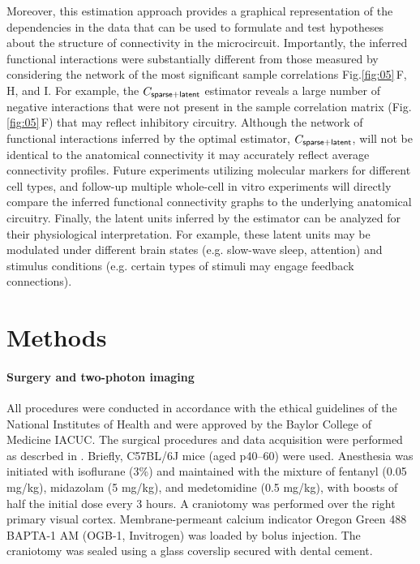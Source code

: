 \documentclass[10pt]{article}
\newcommand{\figref}[2]{Fig.\;\ref{fig:#1}\,#2}
\begin{document}
Moreover, this estimation approach provides a graphical representation of the dependencies in the data that can be used to formulate and test hypotheses about the structure of connectivity in the microcircuit. Importantly, the inferred functional interactions were substantially different from those measured by considering the network of the most significant sample correlations \figref{05}{F, H, and I}.  For example, the $C_{\sf sparse+latent}$ estimator reveals a large number of negative interactions that were not present in the sample correlation matrix (\figref{05}{F}) that may reflect inhibitory circuitry.  Although the network of functional interactions inferred by the optimal estimator, $C_{\sf sparse+latent}$, will not be identical to the anatomical connectivity it may accurately reflect average connectivity profiles. Future experiments utilizing molecular markers for different cell types, and follow-up multiple whole-cell in vitro experiments \cite{Hofer:2011, Ko:2013} will directly compare the inferred functional connectivity graphs to the underlying anatomical circuitry. Finally, the latent units inferred by the estimator can be analyzed for their physiological interpretation. For example, these latent units may be modulated under different brain states (e.g. slow-wave sleep, attention) and stimulus conditions (e.g. certain types of stimuli may engage feedback connections). 

\section*{Methods}
\paragraph{Surgery and two-photon imaging}
All procedures were conducted in accordance with the ethical guidelines of the National Institutes of Health and were approved by the Baylor College of Medicine IACUC.  The surgical procedures and data acquisition were performed as descrbed in \cite{Cotton:2013}. Briefly, C57BL/6J mice (aged p40--60) were used. Anesthesia was initiated with isoflurane (3\%) and maintained with the mixture of fentanyl (0.05 mg/kg), midazolam (5 mg/kg), and medetomidine (0.5 mg/kg), with boosts of half the initial dose every 3 hours.  A craniotomy was performed over the right primary visual cortex.  Membrane-permeant calcium indicator Oregon Green 488 BAPTA-1 AM (OGB-1, Invitrogen) was loaded by bolus injection.  The craniotomy was sealed using a glass coverslip secured with dental cement. 
\end{document}
